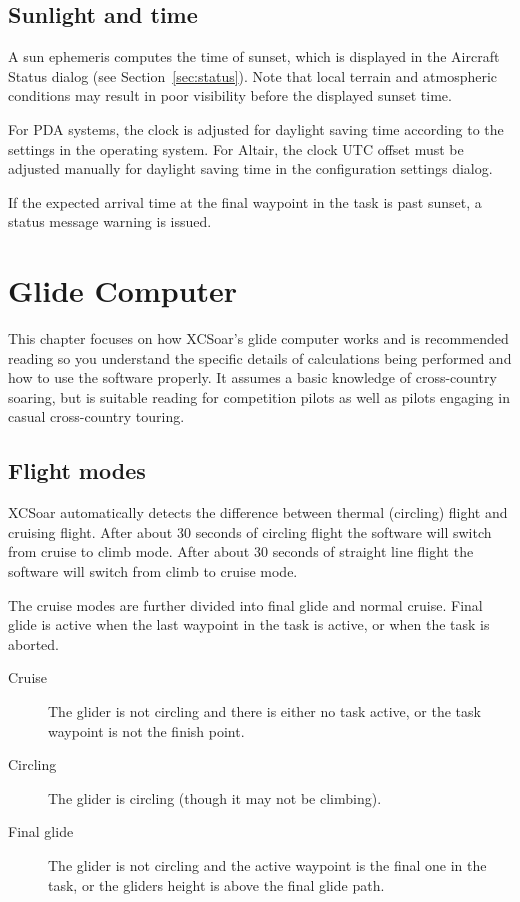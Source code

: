 \documentclass[a4paper,12pt]{refrep}
\begin{document}
\section{Sunlight and time}

A sun ephemeris computes the time of sunset, which is displayed in the
Aircraft Status dialog (see Section~\ref{sec:status}).  Note that
local terrain and atmospheric conditions may result in poor visibility
before the displayed sunset time.

For PDA systems, the clock is adjusted for daylight saving time according
to the settings in the operating system.  For Altair, the clock UTC offset
must be adjusted manually for daylight saving time in the configuration
settings dialog.

If the expected arrival time at the final waypoint in the task is past
sunset, a status message warning is issued.

\chapter{Glide Computer}\label{cha:glide}
This chapter focuses on how XCSoar's glide computer works and is
recommended reading so you understand the specific details of
calculations being performed and how to use the software properly.  It
assumes a basic knowledge of cross-country soaring, but is suitable
reading for competition pilots as well as pilots engaging in casual
cross-country touring.

\section{Flight modes} 

XCSoar automatically detects the difference between thermal (circling)
flight and cruising flight. After about 30 seconds of circling flight
the software will switch from cruise to climb mode. After about 30
seconds of straight line flight the software will switch from climb to
cruise mode.

The cruise modes are further divided into final glide and normal
cruise.  Final glide is active when the last waypoint in the task is
active, or when the task is aborted.

\begin{description}
\item[Cruise]   The glider is not circling and there is either no task
  active, or the task waypoint is not the finish point.
\item[Circling]  The glider is circling (though it may not be climbing).
\item[Final glide]  The glider is not circling and the active waypoint is the
 final one in the task, or the gliders height is above the final glide path.
\end{description}
\end{document}
